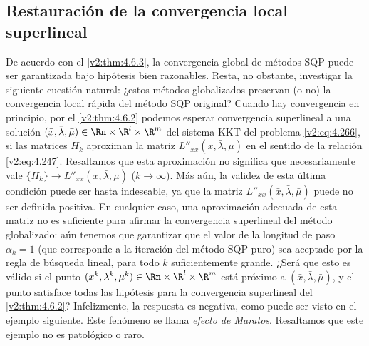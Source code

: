 \subsection{Restauración de la convergencia local superlineal}
\label{v2:sec:4.6.4}

De acuerdo con el \cref{v2:thm:4.6.3}, la convergencia global de métodos SQP puede ser garantizada bajo hipótesis bien razonables. Resta, no obstante, investigar la siguiente cuestión natural: ¿estos métodos globalizados preservan (o no) la convergencia local rápida del método SQP original? Cuando hay convergencia en principio, por el \cref{v2:thm:4.6.2} podemos esperar convergencia superlineal a una solución $(\bar{x}, \bar{\lambda}, \bar{\mu}) \in \Rn \times \R^l \times \R^m$ del sistema KKT del problema \eqref{v2:eq:4.266}, si las matrices $H_k$ aproximan la matriz $L''_{xx}(\bar{x}, \bar{\lambda}, \bar{\mu})$ en el sentido de la relación \eqref{v2:eq:4.247}. Resaltamos que esta aproximación no significa que necesariamente vale $\{H_k\} \to L''_{xx}(\bar{x}, \bar{\lambda}, \bar{\mu})$ ($k \to \infty$). Más aún, la validez de esta última condición puede ser hasta indeseable, ya que la matriz $L''_{xx}(\bar{x}, \bar{\lambda}, \bar{\mu})$ puede no ser definida positiva. En cualquier caso, una aproximación adecuada de esta matriz no es suficiente para afirmar la convergencia superlineal del método globalizado: aún tenemos que garantizar que el valor de la longitud de paso $\alpha_k = 1$ (que corresponde a la iteración del método SQP puro) sea aceptado por la regla de búsqueda lineal, para todo $k$ suficientemente grande. ¿Será que esto es válido si el punto $(x^k, \lambda^k, \mu^k) \in \Rn \times \R^l \times \R^m$ está próximo a $(\bar{x}, \bar{\lambda}, \bar{\mu})$, y el punto satisface todas las hipótesis para la convergencia superlineal del \cref{v2:thm:4.6.2}? Infelizmente, la respuesta es negativa, como puede ser visto en el ejemplo siguiente. Este fenómeno se llama \textit{efecto de Maratos}. Resaltamos que este ejemplo no es patológico o raro.

